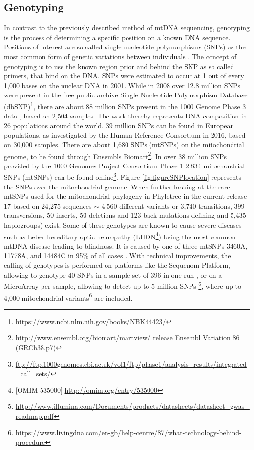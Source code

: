 \subsection{Genotyping}
In contrast to the previously described method of mtDNA sequencing, genotyping is the process of determining a specific position on a known DNA sequence. Positions of interest are so called single nucleotide polymorphisms (SNPs) as the most common form of genetic variations between individuals \cite{Perkel2008,Brandstatter2003}. The concept of genotyping is to use the known region prior and behind the SNP as so called primers, that bind on the DNA. SNPs were estimated to occur at 1 out of every 1,000 bases on the nuclear DNA \cite{Syvanen2001} in 2001. While in 2008 over 12.8 million SNPs were present in the free public archive Single Nucleotide Polymorphism Database (dbSNP)\footnote{\url{https://www.ncbi.nlm.nih.gov/books/NBK44423/}}, there are about 88 million SNPs present in the 1000 Genome Phase 3 data \cite{Auton2015}, based on 2,504 samples. The work thereby represents DNA composition in 26 populations around the world. 39 million SNPs can be found in European populations, as investigated by the Human Reference Consortium \cite{McCarthy2016} in 2016, based on 30,000 samples. There are about 1,680 SNPs (mtSNPs) on the mitochondrial genome, to be found through Ensembls \cite{Flicek2014} Biomart\footnote{\url{http://www.ensembl.org/biomart/martview/} release Ensembl Variation 86 (GRCh38.p7)}. In over 38 million SNPs provided by the 1000 Genomes Project Consortium Phase 1 \cite{Abecasis2012} 2,834 mitochondrial SNPs (mtSNPs) can be found online\footnote{\url{ftp://ftp.1000genomes.ebi.ac.uk/vol1/ftp/phase1/analysis_results/integrated_call_sets/}}. Figure \ref{fig:figureSNPlocation} represents the SNPs over the mitochondrial genome. When further looking at the rare mtSNPs used for the mitochondrial phylogeny in Phylotree \cite{VanOven2009, VanOven2010} in the current release 17 based on 24,275 sequences $\sim$ 4,560 different variants or 3,740 transitions, 399 transversions, 50 inserts, 50 deletions and 123 back mutations defining and 5,435 haplogroups) exist. Some of these genotypes are known to cause severe diseases such as Leber hereditary optic neuropathy (LHON\footnote{[OMIM 535000] \url{http://omim.org/entry/535000}}) \cite{Taylor2005} being the most common mtDNA disease leading to blindness. It is caused by one of three mtSNPs 3460A, 11778A, and 14484C in 95\% of all cases \cite{Elson2007}. With technical improvements, the calling of genotypes is performed on platforms like the Sequenom Platform, allowing to genotype 40 SNPs in a sample set of 396 in one run \cite{Weissensteiner2013}, or on a MicroArray per sample, allowing to detect up to 5 million SNPs  \footnote{\url{http://www.illumina.com/Documents/products/datasheets/datasheet_gwas_roadmap.pdf}}, where up to 4,000 mitochondrial variants\footnote{\url{https://www.livingdna.com/en-gb/help-centre/87/what-technology-behind-procedure}} are included.

